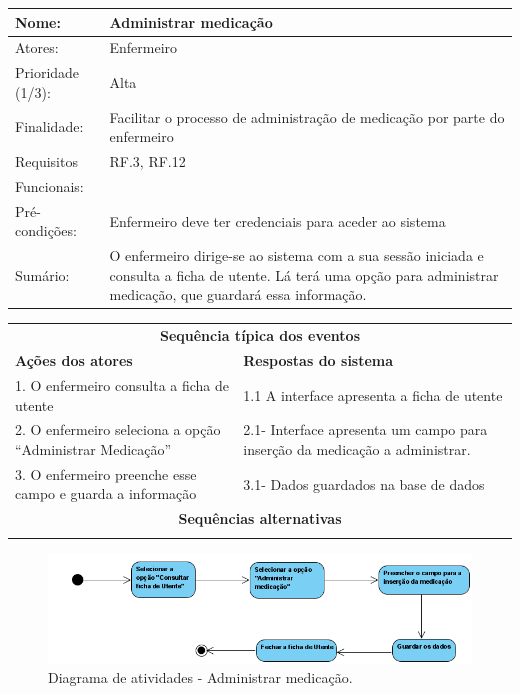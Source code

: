 \documentclass[11pt,a4paper,twoside]{report}
\begin{document}
\begin{center}
	\begin{tabularx}{\textwidth}{|lX|}
		\hline
		\textbf{Nome}: & \textbf{Administrar medicação } \\ \hline
		Atores: & Enfermeiro    \\ \hline
		Prioridade (1/3): & Alta  \\ \hline
		Finalidade: & Facilitar o processo de administração de medicação por parte do enfermeiro       \\ \hline
		Requisitos & RF.3, RF.12     \\
		Funcionais: & \\
		Pré-condições: & Enfermeiro deve ter credenciais para aceder ao sistema \\
		Sumário: & O enfermeiro dirige-se ao sistema com a sua sessão iniciada e consulta a ficha de utente. Lá terá uma opção para administrar medicação, que guardará essa informação.   \\
		\hline
	\end{tabularx}
	
	\begin{tabularx}{\textwidth}{|XX|}
		\hline
		\multicolumn{2}{|c|}{\textbf{Sequência típica dos eventos} }\\
		\textbf{Ações dos atores}  & \textbf{Respostas do sistema} \\
		1.    O enfermeiro consulta a ficha de utente    &   1.1     A interface apresenta a ficha de utente   \\
		2.    O enfermeiro seleciona a opção “Administrar Medicação”      & 2.1-   Interface apresenta um campo para inserção da medicação a administrar.   \\
		3.    O enfermeiro preenche esse campo e guarda a informação     & 3.1-   Dados guardados na base de dados   \\
		\hline
		\multicolumn{2}{|c|}{\textbf{Sequências alternativas } }\\
		\hline
		\multicolumn{2}{|l|}{} \\
		\hline
	\end{tabularx}
	
\end{center}


\begin{figure}[H]
	\centering
	\includegraphics[width=0.7\linewidth]{image/Atividades/Administrar medicação.png}
	\caption [Diagrama de atividades - Administrar medicação.] {Diagrama de atividades - Administrar medicação.}
	\label{fig:administrarmedicacao}
\end{figure}
\end{document}
